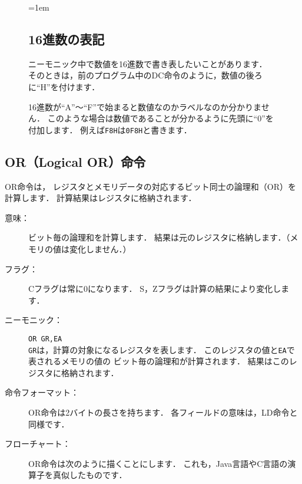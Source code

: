 \begin{figure}[btp]
  \begin{framed}{\parindent=1em
      \subsection*{16進数の表記}
      ニーモニック中で数値を16進数で書き表したいことがあります．
      そのときは，前のプログラム中のDC命令のように，数値の後ろに``H''を付けます．

      16進数が``A''〜``F''で始まると数値なのかラベルなのか分かりません．
      このような場合は数値であることが分かるように先頭に``0''を付加します．
      例えば\texttt{F8H}は\texttt{0F8H}と書きます．
  }\end{framed}
\end{figure}

\newpage
\subsection{OR（Logical OR）命令}
OR命令は，
レジスタとメモリデータの対応するビット同士の論理和（OR）を計算します．
計算結果はレジスタに格納されます．

\begin{description}
\item[意味：]ビット毎の論理和を計算します．
  結果は元のレジスタに格納します．（メモリの値は変化しません．）

\item[フラグ：]Cフラグは常に0になります．
  S，Zフラグは計算の結果により変化します．

\item[ニーモニック：]\texttt{OR  GR,EA} \\
  \texttt{GR}は，計算の対象になるレジスタを表します．
  このレジスタの値と\texttt{EA}で表されるメモリの値の
  ビット毎の論理和が計算されます．
  結果はこのレジスタに格納されます．

\item[命令フォーマット：]OR命令は2バイトの長さを持ちます．
  各フィールドの意味は，LD命令と同様です．


\item[フローチャート：]OR命令は次のように描くことにします．
  これも，Java言語やC言語の演算子を真似したものです．

  \begin{center}
  \end{center}

\end{description}

